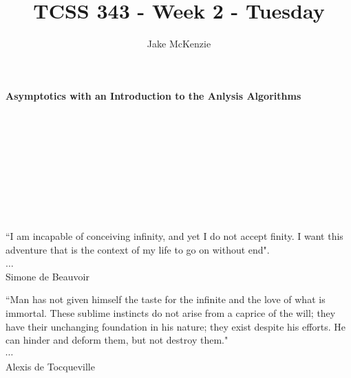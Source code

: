 \documentclass[12pt]{article}
\begin{document}
\title{TCSS 343 - Week 2 - Tuesday}
\author{Jake McKenzie}
\maketitle
\noindent\centerline{\textbf{Asymptotics with an Introduction to the Anlysis Algorithms}}\\\\\\\\\\\\\\\\
\begin{center}
    ``I am incapable of conceiving infinity, and yet I do not accept finity. I want this adventure that is the context of my life to go on without end". \\$\dots$\\ Simone de Beauvoir
\end{center}
\begin{center}
    ``Man has not given himself the taste for the infinite and the love of what is immortal. These sublime instincts do not arise from a caprice of the will; they have their unchanging foundation in his nature; they exist despite his efforts. He can hinder and deform them, but not destroy them."\\
    $\cdots$\\
    Alexis de Tocqueville
\end{center}
\newpage
\end{document}
